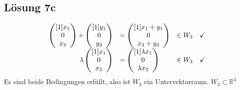 \documentclass[main.tex]{subfiles}
\begin{document}
\subsection{Lösung 7c}
\begin{equation*}
    \begin{array}{ r l l c }
    \begin{pmatrix}[1]
    x_{1}\\
    0\\
    x_{3}
    \end{pmatrix} +\begin{pmatrix}[1]
    y_{1}\\
    0\\
    y_{3}
    \end{pmatrix} & =\begin{pmatrix}[1]
    x_{1} +y_{1}\\
    0\\
    x_{3} +y_{3}
    \end{pmatrix} & \in W_{3} & \checkmark \\
    \lambda \begin{pmatrix}[1]
    x_{1}\\
    0\\
    x_{3}
    \end{pmatrix} & =\begin{pmatrix}[1]
    \lambda x_{1}\\
    0\\
    \lambda x_{3}
    \end{pmatrix} & \in W_{3} & \checkmark 
    \end{array}
\end{equation*}
Es sind beide Bedingungen erfüllt, also ist $W_{3}$ ein Untervektorraum. $W_{3} \subset \mathbb{R}^{3}$ 
\end{document}
